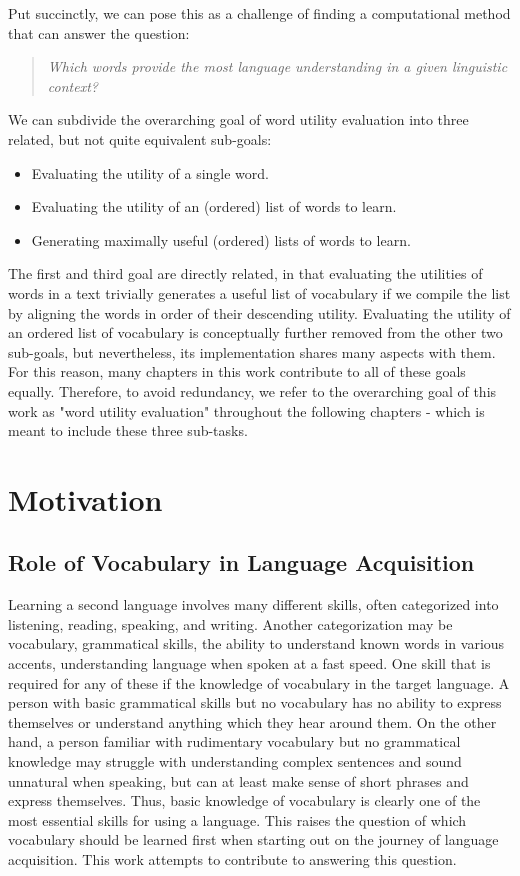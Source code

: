 
Put succinctly, we can pose this as a challenge of finding a computational method that can answer the question:

\begin{quote}
	\textit{Which words provide the most language understanding in a given linguistic context?}
\end{quote}

We can subdivide the overarching goal of word utility evaluation into three related, but not quite equivalent sub-goals:
\begin{itemize}
	\item Evaluating the utility of a single word.
	\item Evaluating the utility of an (ordered) list of words to learn.
	\item Generating maximally useful (ordered) lists of words to learn.
\end{itemize}

The first and third goal are directly related, in that evaluating the utilities of words in a text trivially generates a useful list of vocabulary if we compile the list by aligning the words in order of their descending utility. 
Evaluating the utility of an ordered list of vocabulary is conceptually further removed from the other two sub-goals, but nevertheless, its implementation shares many aspects with them.
For this reason, many chapters in this work contribute to all of these goals equally.
Therefore, to avoid redundancy, we refer to the overarching goal of this work as "word utility evaluation" throughout the following chapters - which is meant to include these three sub-tasks.




\section{Motivation}
\subsection{Role of Vocabulary in Language Acquisition}
Learning a second language involves many different skills, often categorized into listening, reading, speaking, and writing.
Another categorization may be vocabulary, grammatical skills, the ability to understand known words in various accents, understanding language when spoken at a fast speed.
One skill that is required for any of these if the knowledge of vocabulary in the target language.
A person with basic grammatical skills but no vocabulary has no ability to express themselves or understand anything which they hear around them.
On the other hand, a person familiar with rudimentary vocabulary but no grammatical knowledge may struggle with understanding complex sentences and sound unnatural when speaking, but can at least make sense of short phrases and express themselves.
Thus, basic knowledge of vocabulary is clearly one of the most essential skills for using a language.
This raises the question of which vocabulary should be learned first when starting out on the journey of language acquisition.
This work attempts to contribute to answering this question.

